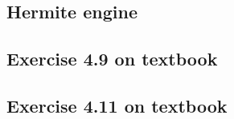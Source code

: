 \subsection{Hermite engine}
\label{subsec:hermiteEngineCode}


\subsection{Exercise 4.9 on textbook}
\label{subsec:exercise49testing}


\subsection{Exercise 4.11 on textbook}
\label{subsec:exercise411}
